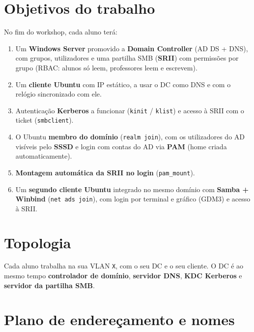 \section*{Objetivos do trabalho}

No fim do workshop, cada aluno terá:

\begin{enumerate}
\item Um \textbf{Windows Server} promovido a \textbf{Domain Controller} (AD DS + DNS), com grupos, utilizadores e uma partilha SMB (\textbf{SRII}) com permissões por grupo (RBAC: alunos só leem, professores leem e escrevem).
\item Um \textbf{cliente Ubuntu} com IP estático, a usar o DC como DNS e com o relógio sincronizado com ele.
\item Autenticação \textbf{Kerberos} a funcionar (\texttt{kinit} / \texttt{klist}) e acesso à SRII com o ticket (\texttt{smbclient}).
\item O Ubuntu \textbf{membro do domínio} (\texttt{realm join}), com os utilizadores do AD visíveis pelo \textbf{SSSD} e login com contas do AD via \textbf{PAM} (home criada automaticamente).
\item \textbf{Montagem automática da SRII no login} (\texttt{pam\_mount}).
\item Um \textbf{segundo cliente Ubuntu} integrado no mesmo domínio com \textbf{Samba + Winbind} (\texttt{net ads join}), com login por terminal e gráfico (GDM3) e acesso à SRII.
\end{enumerate}

\section*{Topologia}


Cada aluno trabalha na sua VLAN \texttt{X}, com o seu DC e o seu cliente. O DC é ao mesmo tempo \textbf{controlador de domínio}, \textbf{servidor DNS}, \textbf{KDC Kerberos} e \textbf{servidor da partilha SMB}.

\section*{Plano de endereçamento e nomes}

